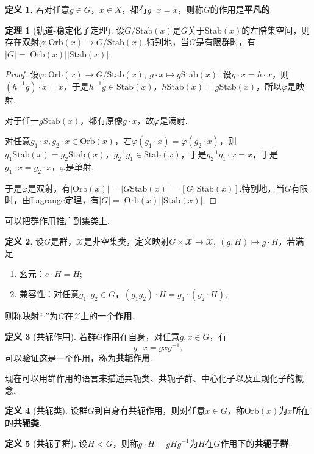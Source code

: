 \documentclass[12pt]{ctexart}
\theoremstyle{definition}
\newtheorem{definition}{定义}
\newtheorem{theorem}{定理}
\theoremstyle{plain}
\newcommand{\Orb}{\mathrm{Orb}}
\newcommand{\Stab}{\mathrm{Stab}}
\begin{document}
	\begin{definition}
		若对任意$g\in G$，$x\in X$，都有$g\cdot x=x$，则称$G$的作用是\textbf{平凡的}.
	\end{definition}
	\begin{theorem}[轨道-稳定化子定理]
		设$G/\Stab(x)$是$G$关于$\Stab(x)$的左陪集空间，则存在双射$\varphi:\Orb(x)\to G/\Stab(x)$.特别地，当$G$是有限群时，有$|G|=|\Orb(x)||\Stab(x)|$.
	\end{theorem}
	\begin{proof}
		设$\varphi:\Orb(x)\to G/\Stab(x),\ g\cdot x\mapsto g\Stab(x)$. 设$g\cdot x=h\cdot x$，则$(h^{-1}g)\cdot x=x$，于是$h^{-1}g\in\Stab(x)$，$h\Stab(x)=g\Stab(x)$，所以$\varphi$是映射.
		
		对于任一$g\Stab(x)$，都有原像$g\cdot x$，故$\varphi$是满射.
		
		对任意$g_1\cdot x,g_2\cdot x\in\Orb(x)$，若$\varphi(g_1\cdot x)=\varphi(g_2\cdot x)$，则$g_1\Stab(x)=g_2\Stab(x)$，$g_2^{-1}g_1\in\Stab(x)$，于是$g_2^{-1}g_1\cdot x=x$，于是$g_1\cdot x=g_2\cdot x$，$\varphi$是单射.
		
		于是$\varphi$是双射，有$|\Orb(x)|=|G\Stab(x)|=\left[G:\Stab(x)\right]$.特别地，当$G$有限时，由Lagrange定理，有$|G|=|\Orb(x)||\Stab(x)|$.
	\end{proof}
	可以把群作用推广到集类上.
	\begin{definition}
		设$G$是群，$\mathcal{X}$是非空集类，定义映射$G\times \mathcal{X}\to \mathcal{X},\ (g,H)\mapsto g\cdot H$，若满足
		\begin{enumerate}
			\item 幺元：$e\cdot H=H$;
			\item 兼容性：对任意$g_1,g_2\in G$，$(g_1g_2)\cdot H=g_1\cdot(g_2\cdot H)$,
		\end{enumerate}
		则称映射“$\cdot$”为$G$在$\mathcal{X}$上的一个\textbf{作用}.
	\end{definition}
	\begin{definition}[共轭作用]
		若群$G$作用在自身，对任意$g,x\in G$，有
		$$g\cdot x=gxg^{-1},$$
		可以验证这是一个作用，称为\textbf{共轭作用}.
	\end{definition}
	现在可以用群作用的语言来描述共轭类、共轭子群、中心化子以及正规化子的概念.
	\begin{definition}[共轭类]
		设群$G$到自身有共轭作用，则对任意$x\in G$，称$\Orb(x)$为$x$所在的\textbf{共轭类}.
	\end{definition}
	\begin{definition}[共轭子群]
		设$H<G$，则称$g\cdot H=gHg^{-1}$为$H$在$G$作用下的\textbf{共轭子群}.
	\end{definition}
\end{document}
